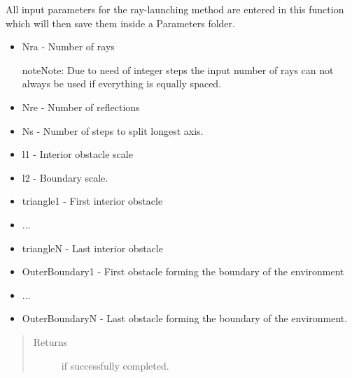 \documentclass[letterpaper,10pt,english]{sphinxmanual}
\begin{document}
\begin{fulllineitems}
\label{index:ParameterInput.DeclareParameters}
All input parameters for the ray-launching method are entered in
this function which will then save them inside a Parameters folder.
\begin{itemize}
\item {} 
Nra - Number of rays

\begin{notice}{note}{Note:}
Due to need of integer steps the input number of rays can not
always be used if everything is equally spaced.
\end{notice}

\item {} 
Nre - Number of reflections

\item {} 
Ns - Number of steps to split longest axis.

\item {} 
l1 - Interior obstacle scale

\item {} 
l2 - Boundary scale.

\item {} 
triangle1 - First interior obstacle

\item {} 
...

\item {} 
triangleN - Last interior obstacle

\item {} 
OuterBoundary1 - First obstacle forming the boundary of the   environment

\item {} 
...

\item {} 
OuterBoundaryN - Last obstacle forming the boundary of the   environment.

\end{itemize}
\begin{quote}\begin{description}
\item[{Returns}]  if successfully completed.

\end{description}\end{quote}

\end{fulllineitems}
\end{document}
